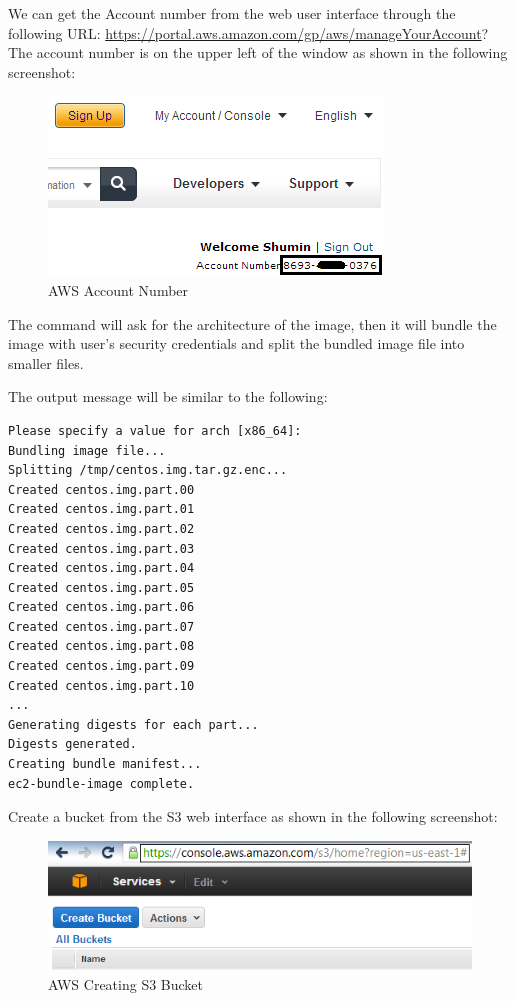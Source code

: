 We can get the Account number from the web user interface through the following URL: \url{https://portal.aws.amazon.com/gp/aws/manageYourAccount}? The account number is on the upper left of the window as shown in the following screenshot:
\begin{figure}[h]
  \centering
  \includegraphics[width=.56\textwidth]{figs/5163os_08_16.png}
  \caption{AWS Account Number}\label{fig:aws.account.number}
\end{figure} 

The command will ask for the architecture of the image, then it will bundle the image with user's security credentials and split the bundled image file into smaller files.

The output message will be similar to the following:
\lstset{style=bashstyle}
\begin{lstlisting}
Please specify a value for arch [x86_64]:
Bundling image file...
Splitting /tmp/centos.img.tar.gz.enc...
Created centos.img.part.00
Created centos.img.part.01
Created centos.img.part.02
Created centos.img.part.03
Created centos.img.part.04
Created centos.img.part.05
Created centos.img.part.06
Created centos.img.part.07
Created centos.img.part.08
Created centos.img.part.09
Created centos.img.part.10
...
Generating digests for each part...
Digests generated.
Creating bundle manifest...
ec2-bundle-image complete.
\end{lstlisting}


Create a bucket from the S3 web interface as shown in the following screenshot:
\begin{figure}[h]
  \centering
  \includegraphics[width=.8\textwidth]{figs/5163os_08_17.png}
  \caption{AWS Creating S3 Bucket}\label{fig:aws.s3.bucket.create}
\end{figure} 


